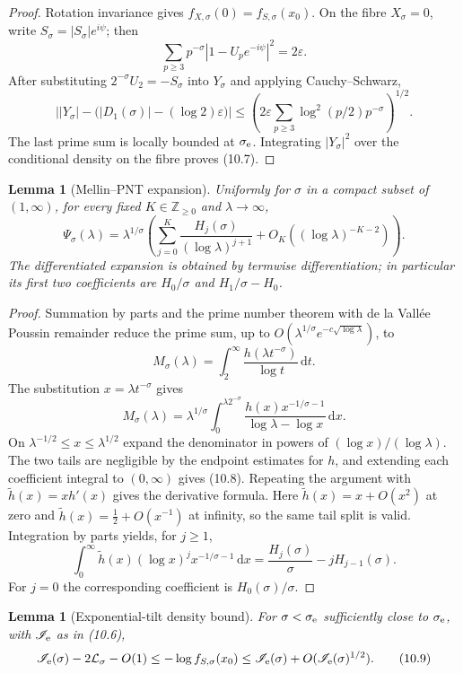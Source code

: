 \documentclass[11pt]{article}
\newtheorem{lemma}[theorem]{Lemma}
\theoremstyle{definition}
\theoremstyle{remark}
\newcommand{\dd}{\,\mathrm d}
\newcommand{\eps}{\varepsilon}
\begin{document}
\begin{proof}
Rotation invariance gives $f_{X,\sigma}(0)=f_{S,\sigma}(x_0)$.  On the fibre
$X_\sigma=0$, write $S_\sigma=|S_\sigma|e^{i\psi}$; then
\[
 \sum_{p\ge3}p^{-\sigma}|1-U_pe^{-i\psi}|^2=2\eps.
\]
After substituting $2^{-\sigma}U_2=-S_\sigma$ into $Y_\sigma$ and applying
Cauchy--Schwarz,
\[
 \left||Y_\sigma|-\bigl(|D_1(\sigma)|-(\log2)\eps\bigr)\right|
 \le
 \left(2\eps\sum_{p\ge3}\log^2(p/2)p^{-\sigma}\right)^{1/2}.
\]
The last prime sum is locally bounded at $\sigma_{\rm e}$.  Integrating
$|Y_\sigma|^2$ over the conditional density on the fibre proves (10.7).
\end{proof}

\begin{lemma}[Mellin--PNT expansion]
\label{lem:mellin-pnt-edge}
Uniformly for $\sigma$ in a compact subset of $(1,\infty)$, for every fixed
$K\in\mathbb Z_{\ge0}$ and $\lambda\to\infty$,
\[
 \Psi_\sigma(\lambda)
 =\lambda^{1/\sigma}\left(
   \sum_{j=0}^{K}\frac{H_j(\sigma)}{(\log\lambda)^{j+1}}
   +O_K((\log\lambda)^{-K-2})\right).
\tag{10.8}
\]
The differentiated expansion is obtained by termwise differentiation; in
particular its first two coefficients are $H_0/\sigma$ and
$H_1/\sigma-H_0$.
\end{lemma}

\begin{proof}
Summation by parts and the prime number theorem with de la Vall\'ee Poussin
remainder reduce the prime sum, up to
$O(\lambda^{1/\sigma}e^{-c\sqrt{\log\lambda}})$, to
\[
 M_\sigma(\lambda)=\int_2^\infty
   \frac{h(\lambda t^{-\sigma})}{\log t}\dd t.
\]
The substitution $x=\lambda t^{-\sigma}$ gives
\[
 M_\sigma(\lambda)=\lambda^{1/\sigma}
 \int_0^{\lambda2^{-\sigma}}
 \frac{h(x)x^{-1/\sigma-1}}{\log\lambda-\log x}\dd x.
\]
On $\lambda^{-1/2}\le x\le\lambda^{1/2}$ expand the denominator in powers
of $(\log x)/(\log\lambda)$.  The two tails are negligible by the endpoint
estimates for $h$, and extending each coefficient integral to $(0,\infty)$
gives (10.8).  Repeating the argument with
$\widetilde h(x)=xh'(x)$ gives the derivative formula.  Here
$\widetilde h(x)=x+O(x^2)$ at zero and
$\widetilde h(x)=\tfrac12+O(x^{-1})$ at infinity, so the same tail split is
valid.  Integration by parts yields, for $j\ge1$,
\[
 \int_0^\infty \widetilde h(x)(\log x)^j x^{-1/\sigma-1}\dd x
 =\frac{H_j(\sigma)}\sigma-jH_{j-1}(\sigma).
\]
For $j=0$ the corresponding coefficient is $H_0(\sigma)/\sigma$.
\end{proof}

\begin{lemma}[Exponential-tilt density bound]
\label{lem:tilted-edge-density}
For $\sigma<\sigma_{\rm e}$ sufficiently close to $\sigma_{\rm e}$, with
$\mathscr I_{\rm e}$ as in (10.6),
\[
 \mathscr I_{\rm e}(\sigma)-2\mathcal L_\sigma-O(1)
 \le -\log f_{S,\sigma}(x_0)
 \le \mathscr I_{\rm e}(\sigma)+O(\mathscr I_{\rm e}(\sigma)^{1/2}).
\tag{10.9}
\]
\end{lemma}
\end{document}
